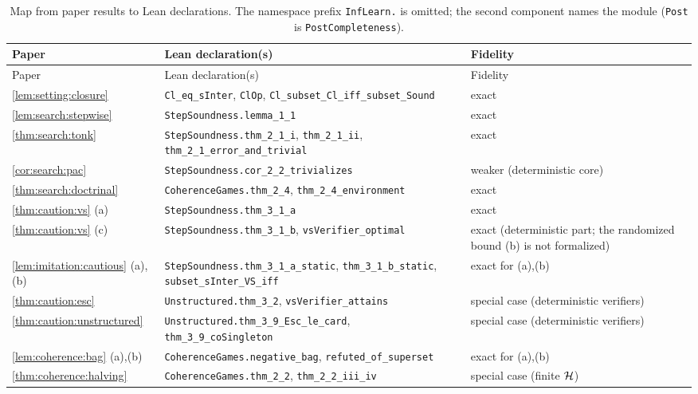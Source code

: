 {\footnotesize
\begin{longtable}{@{}>{\raggedright\arraybackslash}p{2.9cm}>{\raggedright\arraybackslash}p{7.6cm}>{\raggedright\arraybackslash}p{4.4cm}@{}}
\caption{Map from paper results to Lean declarations. The namespace prefix \texttt{InfLearn.} is omitted; the second component names the module (\texttt{Post} is \texttt{PostCompleteness}).}\label{tab:lean:map}\\
\toprule
Paper & Lean declaration(s) & Fidelity\\
\midrule\endfirsthead
\toprule
Paper & Lean declaration(s) & Fidelity\\
\midrule\endhead
\cref{lem:setting:closure} & \texttt{Cl\_eq\_sInter}, \texttt{ClOp}, \texttt{Cl\_subset\_Cl\_iff\_subset\_Sound} & exact\\
\cref{lem:search:stepwise} & \texttt{StepSoundness.\allowbreak lemma\_1\_1} & exact\\
\cref{thm:search:tonk} & \texttt{StepSoundness.\allowbreak thm\_2\_1\_i}, \texttt{thm\_2\_1\_ii}, \texttt{thm\_2\_1\_error\_and\_trivial} & exact\\
\cref{cor:search:pac} & \texttt{StepSoundness.\allowbreak cor\_2\_2\_trivializes} & weaker (deterministic core)\\
\cref{thm:search:doctrinal} & \texttt{CoherenceGames.\allowbreak thm\_2\_4}, \texttt{thm\_2\_4\_environment} & exact\\
\cref{thm:caution:vs} (a) & \texttt{StepSoundness.\allowbreak thm\_3\_1\_a} & exact\\
\cref{thm:caution:vs} (c) & \texttt{StepSoundness.\allowbreak thm\_3\_1\_b}, \texttt{vsVerifier\_optimal} & exact (deterministic part; the randomized bound (b) is not formalized)\\
\cref{lem:imitation:cautious} (a),(b) & \texttt{StepSoundness.\allowbreak thm\_3\_1\_a\_static}, \texttt{thm\_3\_1\_b\_static}, \texttt{subset\_sInter\_VS\_iff} & exact for (a),(b)\\
\cref{thm:caution:esc} & \texttt{Unstructured.\allowbreak thm\_3\_2}, \texttt{vsVerifier\_attains} & special case (deterministic verifiers)\\
\cref{thm:caution:unstructured} & \texttt{Unstructured.\allowbreak thm\_3\_9\_Esc\_le\_card}, \texttt{thm\_3\_9\_coSingleton} & special case (deterministic verifiers)\\
\cref{lem:coherence:bag} (a),(b) & \texttt{CoherenceGames.\allowbreak negative\_bag}, \texttt{refuted\_of\_superset} & exact for (a),(b)\\
\cref{thm:coherence:halving} & \texttt{CoherenceGames.\allowbreak thm\_2\_2}, \texttt{thm\_2\_2\_iii\_iv} & special case (finite $\mathcal{H}$)\\

\end{longtable}}
